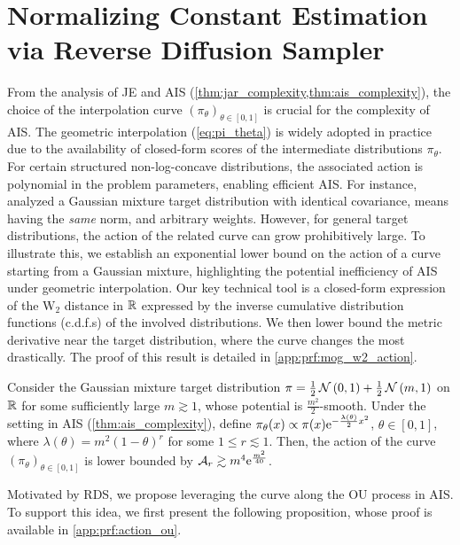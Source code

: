 \section{Normalizing Constant Estimation via Reverse Diffusion Sampler}
\label{sec:revdif}
From the analysis of JE and AIS (\cref{thm:jar_complexity,thm:ais_complexity}), the choice of the interpolation curve $(\pi_\theta)_{\theta\in[0,1]}$ is crucial for the complexity of AIS. The geometric interpolation (\cref{eq:pi_theta}) is widely adopted in practice due to the availability of closed-form scores of the intermediate distributions $\pi_\theta$. For certain structured non-log-concave distributions, the associated action is polynomial in the problem parameters, enabling efficient AIS. For instance, \citet[Ex. 2]{guo2025provable} analyzed a Gaussian mixture target distribution with identical covariance, means having the \textit{same} norm, and arbitrary weights. However, for general target distributions, the action of the related curve can grow prohibitively large. To illustrate this, we establish an exponential lower bound on the action of a curve starting from a Gaussian mixture, highlighting the potential inefficiency of AIS under geometric interpolation. Our key technical tool is a closed-form expression of the $\text{W}_\text{2}$ distance in $\mathbb{R}$ expressed by the inverse cumulative distribution functions (c.d.f.s) of the involved distributions. We then lower bound the metric derivative near the target distribution, where the curve changes the most drastically. The proof of this result is detailed in \cref{app:prf:mog_w2_action}.

\begin{proposition}
    Consider the Gaussian mixture target distribution $\pi=\frac{1}{2}\operatorname{\mathcal{N}}\left(0,1\right)+\frac{1}{2}\operatorname{\mathcal{N}}\left(m,1\right)$ on $\mathbb{R}$ for some sufficiently large $m\gtrsim1$, whose potential is $\frac{m^2}{2}$-smooth. Under the setting in AIS (\cref{thm:ais_complexity}), define $\pi_\theta(x)\propto\pi(x)\mathrm{e}^{-\frac{\lambda(\theta)}{2}x^2}$, $\theta\in[0,1]$, where $\lambda(\theta)=m^2(1-\theta)^r$ for some $1\le r\lesssim1$. Then, the action of the curve $(\pi_\theta)_{\theta\in[0,1]}$ is lower bounded by $\mathcal{A}_r\gtrsim m^{4}\mathrm{e}^{\frac{m^2}{40}}$.
    \label{thm:mog_w2_action}
\end{proposition}

Motivated by RDS, we propose leveraging the curve along the OU process in AIS. To support this idea, we first present the following proposition, whose proof is available in \cref{app:prf:action_ou}.

